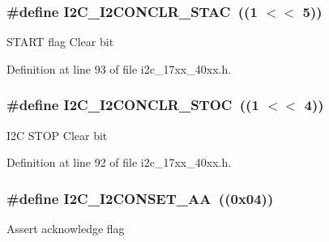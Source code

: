 \subsubsection[{\texorpdfstring{I2\+C\+\_\+\+I2\+C\+O\+N\+C\+L\+R\+\_\+\+S\+T\+AC}{I2C_I2CONCLR_STAC}}]{\setlength{\rightskip}{0pt plus 5cm}\#define I2\+C\+\_\+\+I2\+C\+O\+N\+C\+L\+R\+\_\+\+S\+T\+AC~((1 $<$$<$ 5))}\hypertarget{group__I2C__17XX__40XX_gab6148bf41d7fc32bd259d2f6a7d7667d}{}\label{group__I2C__17XX__40XX_gab6148bf41d7fc32bd259d2f6a7d7667d}
S\+T\+A\+RT flag Clear bit 

Definition at line 93 of file i2c\+\_\+17xx\+\_\+40xx.\+h.

\subsubsection[{\texorpdfstring{I2\+C\+\_\+\+I2\+C\+O\+N\+C\+L\+R\+\_\+\+S\+T\+OC}{I2C_I2CONCLR_STOC}}]{\setlength{\rightskip}{0pt plus 5cm}\#define I2\+C\+\_\+\+I2\+C\+O\+N\+C\+L\+R\+\_\+\+S\+T\+OC~((1 $<$$<$ 4))}\hypertarget{group__I2C__17XX__40XX_ga449d7af35550484c4dfefcddd01095b8}{}\label{group__I2C__17XX__40XX_ga449d7af35550484c4dfefcddd01095b8}
I2C S\+T\+OP Clear bit 

Definition at line 92 of file i2c\+\_\+17xx\+\_\+40xx.\+h.

\subsubsection[{\texorpdfstring{I2\+C\+\_\+\+I2\+C\+O\+N\+S\+E\+T\+\_\+\+AA}{I2C_I2CONSET_AA}}]{\setlength{\rightskip}{0pt plus 5cm}\#define I2\+C\+\_\+\+I2\+C\+O\+N\+S\+E\+T\+\_\+\+AA~((0x04))}\hypertarget{group__I2C__17XX__40XX_ga784c4b2fe7f3299e338655d2ddbf283c}{}\label{group__I2C__17XX__40XX_ga784c4b2fe7f3299e338655d2ddbf283c}
Assert acknowledge flag 

